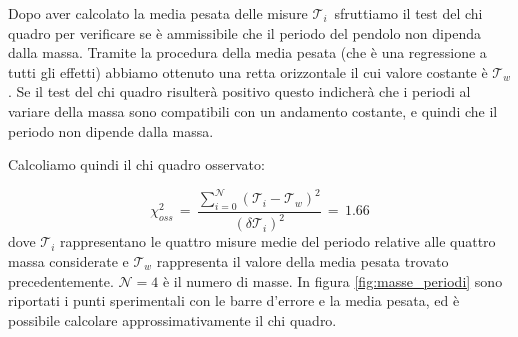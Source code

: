 \label{m_chi_pesata}

Dopo aver calcolato la media pesata delle misure $\mathcal{T}_i\,$ sfruttiamo il test del chi quadro per verificare se
è ammissibile che il periodo del pendolo non dipenda dalla massa. Tramite la procedura della media pesata (che è una regressione
a tutti gli effetti) abbiamo ottenuto
una retta orizzontale il cui valore costante è $\mathcal{T}_w$. Se il test del chi quadro risulterà positivo questo indicherà
che i periodi al variare della massa sono compatibili con un andamento costante, e quindi che il periodo non dipende dalla massa.


%
Calcoliamo quindi il chi quadro osservato:

\begin{equation*}
	\chi_{oss}^2 \,=\, \frac{\sum_{i=0}^{\mathcal{N}} (\mathcal{T}_i - \mathcal{T}_w)^2}{(\delta \mathcal{T}_i)^2} \,=\, 1.66
\end{equation*}
%
dove $\mathcal{T}_i$ rappresentano le quattro misure medie del periodo relative alle quattro massa considerate e $\mathcal{T}_w$ rappresenta il valore della media pesata trovato precedentemente. $\mathcal{N} = 4$ è il numero di masse. In figura \ref{fig:masse_periodi} sono
riportati i punti sperimentali con le barre d'errore e la media pesata, ed è possibile calcolare approssimativamente il chi quadro. \\

